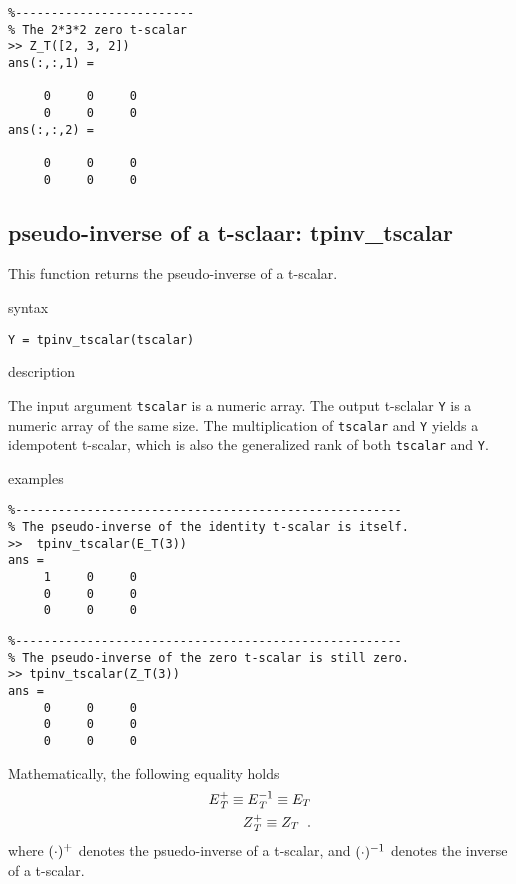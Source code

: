 \documentclass[12pt,reqno]{amsart}
\numberwithin{equation}{section}
\numberwithin{figure}{section}
\numberwithin{table}{section}
\theoremstyle{definition}
\begin{document}
\begin{verbatim}
%-------------------------   
% The 2*3*2 zero t-scalar  
>> Z_T([2, 3, 2])
ans(:,:,1) =

     0     0     0
     0     0     0
ans(:,:,2) =

     0     0     0
     0     0     0
\end{verbatim}



\subsection{{\color{blue} \sc pseudo-inverse of a t-sclaar}: {\color{blue}tpinv\_tscalar}} 
This function returns the pseudo-inverse of a t-scalar. 



\noindent 
{\color{red} \sc syntax}

{\tt  Y = tpinv\_tscalar(tscalar) }


\noindent
{\color{red} \sc description}

The input argument {\tt tscalar} is a numeric array. The output t-sclalar  {\tt Y} is a numeric array of the same size.  
The multiplication of {\tt tscalar}  and {\tt Y}  yields a idempotent t-scalar, which is also the generalized rank of both  {\tt tscalar}  and {\tt Y}. 


\noindent
{\color{red} \sc examples}
\begin{verbatim}
%------------------------------------------------------   
% The pseudo-inverse of the identity t-scalar is itself.   
>>  tpinv_tscalar(E_T(3))
ans =
     1     0     0
     0     0     0
     0     0     0
\end{verbatim}

\begin{verbatim}
%------------------------------------------------------   
% The pseudo-inverse of the zero t-scalar is still zero.  
>> tpinv_tscalar(Z_T(3))
ans =
     0     0     0
     0     0     0
     0     0     0
\end{verbatim}




Mathematically, the following equality holds
\begin{equation}
\begin{aligned}
E_\mathit{T}^{\scalebox{0.8}{$+$}} \equiv E_\mathit{T}^{\scalebox{0.8}{$-1$}} \equiv E_{T} \\
Z_\mathit{T}^{\scalebox{0.8}{$+$}} \equiv Z_{T} \;\;.
\end{aligned}
\end{equation}
where $(\cdot)^{\scalebox{0.8}{$+$}}$ denotes the psuedo-inverse of a t-scalar, 
and $(\cdot)^{\scalebox{0.8}{$-1$}}$ denotes the inverse of a t-scalar.
\end{document}
